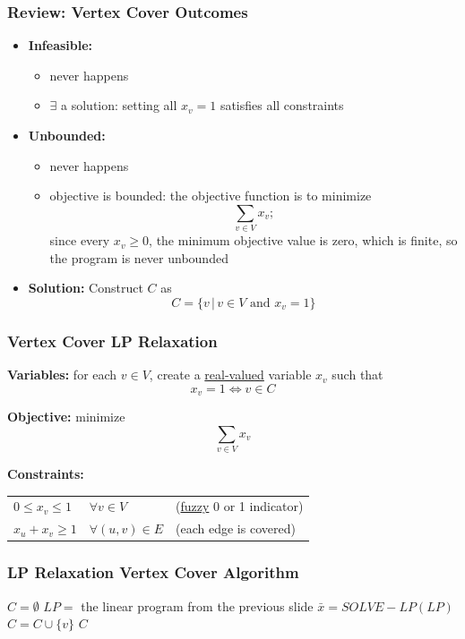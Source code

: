 \documentclass{beamer}
\begin{document}
\begin{frame} \frametitle{Review: Vertex Cover Outcomes}
  \begin{itemize}
    \item \textbf{Infeasible:}
      \begin{itemize}
      \item never happens
      \item $\exists$ a solution: setting all $x_v=1$ satisfies all constraints
      \end{itemize}
    \item \textbf{Unbounded:}
    \begin{itemize}
      \item never happens
      \item objective is bounded: the objective function is to minimize 
        \[ \sum_{v \in V} x_v; \]
        since every $x_v \geq 0$, the minimum objective value is zero, which is finite, so the program is never unbounded
    \end{itemize}
    \item \textbf{Solution:} Construct $C$ as
      \[ C = \{ v \,|\, v \in V \text{ and } x_v=1 \} \]
    \end{itemize}
\end{frame}

\begin{frame} \frametitle{Vertex Cover LP Relaxation}
  \textbf{Variables:} for each $v \in V$, create a \underline{real-valued} variable $x_v$ such that
  \[ x_v = 1 \Leftrightarrow v \in C \]
  
  \textbf{Objective:} minimize
  \[ \sum_{v \in V} x_v \]
  
  \textbf{Constraints:}
  \begin{tabular}{lll}
    $0 \leq x_v \leq 1$ & $\forall v \in V$ & (\underline{fuzzy} 0 or 1 indicator) \\
    $x_u + x_v \geq 1$ & $\forall (u, v) \in E$ & (each edge is covered)
  \end{tabular}
  
\end{frame}

\begin{frame} \frametitle{LP Relaxation Vertex Cover Algorithm}
  \begin{algorithmic}[1]
      \State $C = \emptyset$
      \State $LP = $ the linear program from the previous slide
      \State $\bar{x} = SOLVE-LP(LP)$ 
         
          \State $C = C \cup \{v \}$
        \EndIf
      \EndFor
      \State \Return $C$
    \EndFunction
  \end{algorithmic}
\end{frame}
\end{document}
